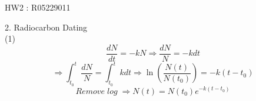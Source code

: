 \documentclass [24pt] {article}
\begin{document}
	\begin {center}
		HW2 : R05229011
	\end {center}
	2. Radiocarbon Dating\\
	(1)
	\[\frac{dN}{dt} = -kN \Rightarrow \frac{dN}{N} = -k dt\]
	\[\Rightarrow \int_{t_{0}}^{t}\frac{dN}{N} = \int_{t_0}^{t} k dt \Rightarrow \ln(\frac{N(t)}{N(t_0)}) = -k(t-t_0)\]
	\[Remove\; log\; \Rightarrow N(t) = N(t_0)e^{-k(t-t_0)}\]
\end{document}
